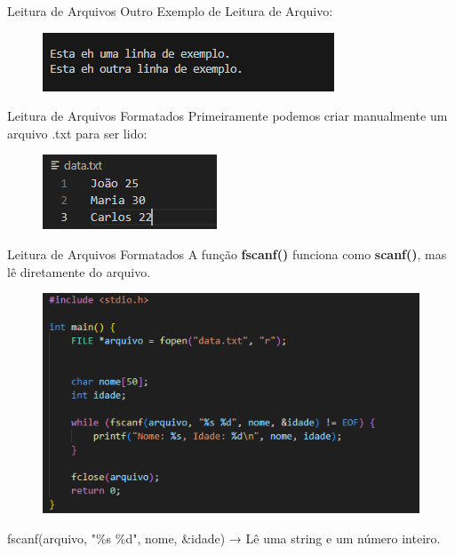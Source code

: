 \begin{frame}{Leitura de Arquivos}
Outro Exemplo de Leitura de Arquivo:
    \begin{figure}
        \centering
        \includegraphics[width=1\linewidth]{figuras/ArqLeitura2.png}
    \end{figure}
\end{frame}

\begin{frame}{Leitura de Arquivos Formatados}
Primeiramente podemos criar manualmente um arquivo .txt para ser lido:
\begin{figure}
    \centering
    \includegraphics[width=0.6\linewidth]{figuras/ArqForm1.png}
\end{figure}

\end{frame}

\begin{frame}{Leitura de Arquivos Formatados}
A função \textbf{fscanf()} funciona como \textbf{scanf()}, mas lê diretamente do arquivo.
\begin{figure}
    \centering
    \includegraphics[width=0.65\linewidth]{figuras/ArqForm2.png}
\end{figure}

fscanf(arquivo, "\%s \%d", nome, \&idade) → Lê uma string e um número inteiro.
\end{frame}


